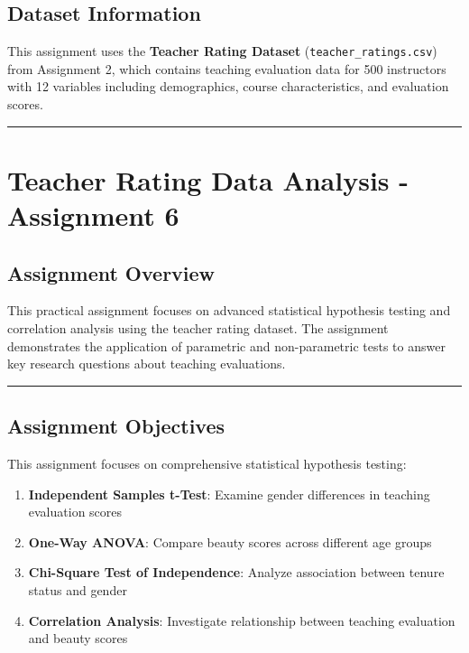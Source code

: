 \documentclass[11pt]{article}
\providecommand{\tightlist}{%
      \setlength{\itemsep}{0pt}\setlength{\parskip}{0pt}}
\begin{document}
\subsection{\texorpdfstring{\textbf{Dataset
Information}}{Dataset Information}}\label{dataset-information}

This assignment uses the \textbf{Teacher Rating Dataset}
(\texttt{teacher\_ratings.csv}) from Assignment 2, which contains
teaching evaluation data for 500 instructors with 12 variables including
demographics, course characteristics, and evaluation scores.

\begin{center}\rule{0.5\linewidth}{0.5pt}\end{center}

    \section{Teacher Rating Data Analysis - Assignment
6}\label{teacher-rating-data-analysis---assignment-6}

\subsection{\texorpdfstring{\textbf{Assignment
Overview}}{Assignment Overview}}\label{assignment-overview}

This practical assignment focuses on advanced statistical hypothesis
testing and correlation analysis using the teacher rating dataset. The
assignment demonstrates the application of parametric and non-parametric
tests to answer key research questions about teaching evaluations.

\begin{center}\rule{0.5\linewidth}{0.5pt}\end{center}

\subsection{\texorpdfstring{\textbf{Assignment
Objectives}}{Assignment Objectives}}\label{assignment-objectives}

This assignment focuses on comprehensive statistical hypothesis testing:

\begin{enumerate}
\def\labelenumi{\arabic{enumi}.}
\tightlist
\item
  \textbf{Independent Samples t-Test}: Examine gender differences in
  teaching evaluation scores
\item
  \textbf{One-Way ANOVA}: Compare beauty scores across different age
  groups
\item
  \textbf{Chi-Square Test of Independence}: Analyze association between
  tenure status and gender
\item
  \textbf{Correlation Analysis}: Investigate relationship between
  teaching evaluation and beauty scores
\end{enumerate}
\end{document}
